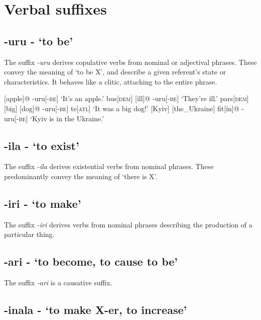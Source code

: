 \section{Verbal suffixes}


\subsection{-uru - `to be'}

The suffix \textit{-uru} derives copulative verbs from nominal or adjectival phrases. These convey the meaning of `to be X', and describe a given referent's state or characteristics. It behaves like a clitic, attaching to the entire phrase.

\pex
\a\begingl
{}[apple]@
-uru[-\textsc{be}]
\glft `It's an apple.'
\endgl
\a\begingl
bus[\textsc{dem}]
[ill]@
-uru[-\textsc{be}]
\glft `They're ill.'
\endgl
\a\begingl
pars[\textsc{dem}]
[big]
[dog]@
-uru[-\textsc{be}]
te[\textsc{atl}]
\glft `It was a big dog!'
\endgl
\a\begingl
{}[Kyiv]
[the\_Ukraine]
fit[in]@
-uru[-\textsc{be}]
\glft `Kyiv is in the Ukraine.'
\endgl
\xe

\subsection{-ila - `to exist'}

The suffix \textit{-ila} derives existential verbs from nominal phrases. These predominantly convey the meaning of `there is X'. 

\subsection{-iri - `to make'}

The suffix \textit{-iri} derives verbs from nominal phrases describing the production of a particular thing.

\subsection{-ari - `to become, to cause to be'}

The suffix \textit{-ari} is a causative suffix.

\subsection{-inala - `to make X-er, to increase'}


